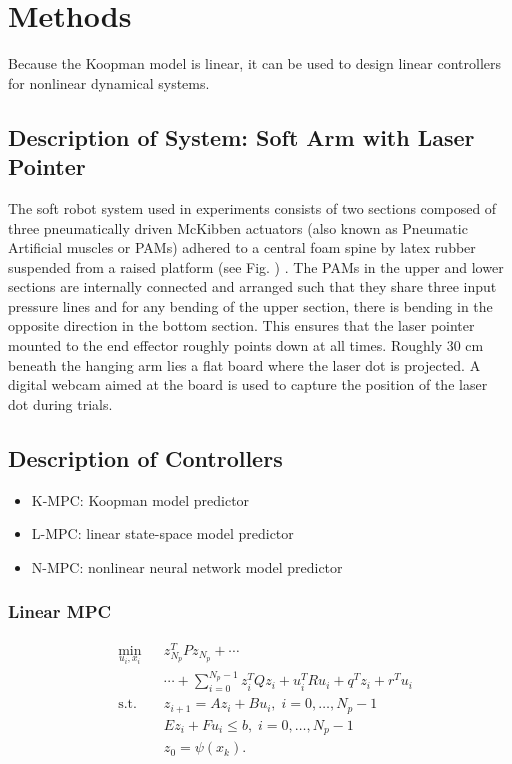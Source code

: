 \section{Methods}
\label{sec:methods}

Because the Koopman model is linear, it can be used to design linear controllers for nonlinear dynamical systems.


\subsection{Description of System: Soft Arm with Laser Pointer}

The soft robot system used in experiments consists of two sections composed of three pneumatically driven McKibben actuators (also known as Pneumatic Artificial muscles or PAMs) adhered to a central foam spine by latex rubber suspended from a raised platform (see Fig. ) .
The PAMs in the upper and lower sections are internally connected and arranged such that they share three input pressure lines and for any bending of the upper section, there is bending in the opposite direction in the bottom section.
This ensures that the laser pointer mounted to the end effector roughly points down at all times.
Roughly 30 cm beneath the hanging arm lies a flat board where the laser dot is projected.
A digital webcam aimed at the board is used to capture the position of the laser dot during trials.


\subsection{Description of Controllers}

\begin{itemize}
    \item K-MPC: Koopman model predictor
    \item L-MPC: linear state-space model predictor
    \item N-MPC: nonlinear neural network model predictor
\end{itemize}

\subsubsection{Linear MPC}

\begin{equation}
\begin{aligned}
& \underset{u_{i} , x_{i}}{\text{min}}
& & z_{N_p}^{T} P z_{N_p} + \cdots \\
&&& \cdots + \sum_{i=0}^{N_p - 1} z_i^T Q z_i + u_i^T R u_i + q^T z_i + r^T u_i\\
& \text{s.t.}
& & z_{i+1} = A z_i + B u_i , \; i = 0 , \ldots , N_p - 1 \\
&&& E z_i + F u_i \leq b , \; i = 0 , \ldots , N_p - 1 \\
&&& z_0 = \psi(x_k).
\end{aligned}
\end{equation}


